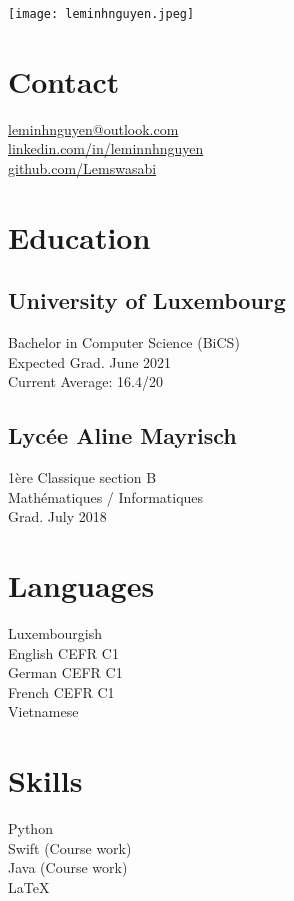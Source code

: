 \documentclass[]{curriculumvitae}
\begin{document}
\hfill \texttt{[image: leminhnguyen.jpeg]}
    
\begin{minipage}[t]{0.34\textwidth} 

\section{Contact}
\faEnvelope \hspace{1em} \href{}{leminhnguyen@outlook.com}\\ 
\faLinkedin \hspace{1em} \href{https://www.linkedin.com/in/leminnhnguyen}{linkedin.com/in/leminnhnguyen}\\
\faGithub \hspace{1em} \href{https://github.com/Lemswasabi}{github.com/Lemswasabi}
\sectionsep

\section{Education} 
\subsection{University of Luxembourg}
Bachelor in Computer Science (BiCS)\\
Expected Grad. June 2021\\
Current Average: 16.4/20\\

\subsection{Lycée Aline Mayrisch}
1ère Classique section B\\
Mathématiques / Informatiques\\
Grad. July 2018
\sectionsep

\section{Languages}
Luxembourgish\\
English CEFR C1\\
German CEFR C1\\
French CEFR C1\\
Vietnamese
\sectionsep

\section{Skills}
Python\\
Swift (Course work)\\
Java (Course work)\\
LaTeX
\sectionsep


\end{minipage}
\end{document}
